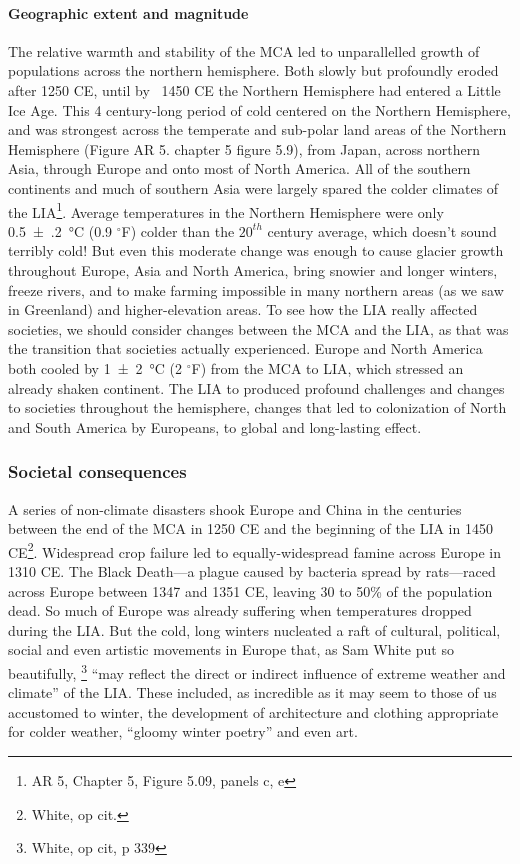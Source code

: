 \paragraph{Geographic extent and magnitude}
The relative warmth and stability of the MCA led to unparallelled growth of populations across the northern hemisphere. Both slowly but profoundly eroded after 1250 CE, until by ~1450 CE the Northern Hemisphere had entered a Little Ice Age. This 4 century-long period of cold centered on the Northern Hemisphere, and was strongest across the temperate and sub-polar land areas of the Northern Hemisphere (Figure AR 5. chapter 5 figure 5.9), from Japan, across northern Asia, through Europe and onto most of North America. All of the southern continents and much of southern Asia were largely spared the colder climates of the LIA\footnote{AR 5, Chapter 5, Figure 5.09, panels c, e}. Average temperatures in the Northern Hemisphere were only \SI{0.5(2)}{\celsius} (0.9 $^\circ$F) colder than the $20^{th}$ century average, which doesn't sound terribly cold! But even this moderate change was enough to cause glacier growth throughout Europe, Asia and North America, bring snowier and longer winters, freeze rivers, and to make farming impossible in many northern areas (as we saw in Greenland) and higher-elevation areas. To see how the LIA really affected societies, we should consider changes between the MCA and the LIA, as that was the transition that societies actually experienced. Europe and North America both cooled by \SI{1(2)}{\celsius} (2 $^\circ$F) from the MCA to LIA, which stressed an already shaken continent. The LIA to produced profound challenges and changes to societies throughout the hemisphere, changes that led to colonization of North and South America by Europeans, to global and long-lasting effect.

\subsubsection{Societal consequences}
A series of non-climate disasters shook Europe and China in the centuries between the end of the MCA in 1250 CE and the beginning of the LIA in 1450 CE\footnote{White, op cit.}. Widespread crop failure led to equally-widespread famine across Europe in 1310 CE. The Black Death---a plague caused by bacteria spread by rats---raced across Europe between 1347 and 1351 CE, leaving 30 to 50\% of the population dead. So much of Europe was already suffering when temperatures dropped during the LIA. But the cold, long winters nucleated a raft of cultural, political, social and even artistic movements in Europe that, as Sam White put so beautifully, \footnote{White, op cit, p 339} ``may reflect the direct or indirect influence of extreme weather and climate'' of the LIA. These included, as incredible as it may seem to those of us accustomed to winter, the development of architecture and clothing appropriate for colder weather, ``gloomy winter poetry'' and even art. \\


